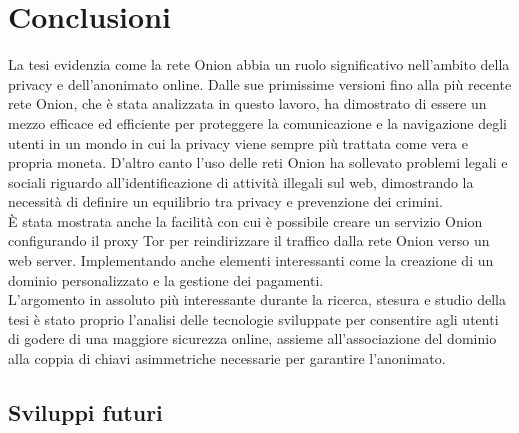 \chapter{Conclusioni}

La tesi evidenzia come la rete Onion abbia un ruolo significativo nell'ambito della privacy e dell'anonimato online. 
Dalle sue primissime versioni fino alla più recente rete Onion, che è stata analizzata in questo lavoro, ha dimostrato di essere un mezzo efficace ed efficiente per proteggere la comunicazione e la navigazione degli utenti in un mondo in cui la privacy viene sempre più trattata come vera e propria moneta.
D'altro canto l'uso delle reti Onion ha sollevato problemi legali e sociali riguardo all'identificazione di attività illegali sul web, dimostrando la necessità di definire un equilibrio tra privacy e prevenzione dei crimini.
\\

È stata mostrata anche la facilità con cui è possibile creare un servizio Onion configurando il proxy Tor per reindirizzare il traffico dalla rete Onion verso un web server. 
Implementando anche elementi interessanti come la creazione di un dominio personalizzato e la gestione dei pagamenti.
\\

L'argomento in assoluto più interessante durante la ricerca, stesura e studio della tesi è stato proprio l'analisi delle tecnologie sviluppate per consentire agli utenti di godere di una maggiore sicurezza online, assieme all'associazione del dominio alla coppia di chiavi asimmetriche necessarie per garantire l'anonimato. 

\section{Sviluppi futuri}
